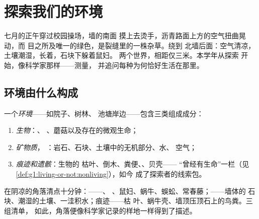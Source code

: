 \chapter{探索我们的环境}\label{ch:g6:exploring-our-environment}

七月的正午穿过校园操场，墙的南面
摸上去烫手，沥青路面上方的空气扭曲晃动，而
目之所及唯一的绿色，是裂缝里的一株杂草。绕到
北墙后面：空气清凉，土壤潮湿，长着，石块下躲着鼠妇。
两个世界，相距仅三米。本学年从探索
开始，像科学家那样——测量，
并追问每种为何恰好生活在那里。

\section{环境由什么构成}

\begin{definition}[环境的组成成分]\label{def:g6:exploring-our-environment:components}
一个\emph{环境}——如院子、树林、
池塘岸边——包含三类组成成分：
\begin{enumerate}
  \item \emph{生物}：、
        、蘑菇以及存在的微观生命；
  \item \emph{矿物质}，
        ：岩石、石块、土壤中的无机部分、水、
        空气；
  \item \emph{痕迹和遗骸}：生物的
        枯叶、倒木、粪便、、贝壳——
        “曾经有生命”一栏（见
        \cref{def:g1:living-or-not:nonliving}），如今
        成了探索者的线索包。
\end{enumerate}
\end{definition}

\begin{example}[北墙后的清点]\label{ex:g6:exploring-our-environment:inventory}
在阴凉的角落清点十分钟：——、
、鼠妇、蜗牛、蜈蚣、常春藤；——墙体的
石块、潮湿的土壤、一洼积水；痕迹——枯
叶、蜗牛壳、墙顶压顶石上的鸟粪。三组清单，
如此，角落便像科学家记录的样地一样得到了描述。
\end{example}

